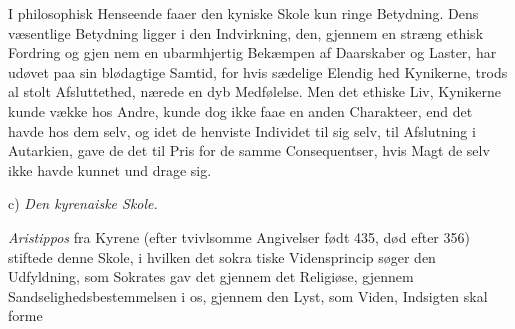 \documentclass[12pt,a4paper]{book}
\begin{document}
I philosophisk Henseende faaer den kyniske Skole kun
ringe Betydning. Dens væsentlige Betydning ligger i den
Indvirkning, den, gjennem en stræng ethisk Fordring og gjen\-%
nem en ubarmhjertig Bekæmpen af Daarskaber og Laster, har
udøvet paa sin blødagtige Samtid, for hvis sædelige Elendig\-%
hed Kynikerne, trods al stolt Afsluttethed, nærede en dyb
Medfølelse. Men det ethiske Liv, Kynikerne kunde vække hos
Andre, kunde dog ikke faae en anden Charakteer, end det havde
hos dem selv, og idet de henviste Individet til sig selv, til
Afslutning i Autarkien, gave de det til Pris for de samme
Consequentser, hvis Magt de selv ikke havde kunnet und\-%
drage sig.

\begin{center}
c) \emph{Den kyrenaiske Skole.}
\end{center}
\emph{Aristippos} fra Kyrene (efter tvivlsomme Angivelser født
435, død efter 356) stiftede denne Skole, i hvilken det sokra\-%
tiske Vidensprincip søger den Udfyldning, som Sokrates gav
det gjennem det Religiøse, gjennem Sandselighedsbestemmelsen
i os, gjennem den Lyst, som Viden, Indsigten skal forme
\setcounter{footnote}{0}
%
\end{document}
